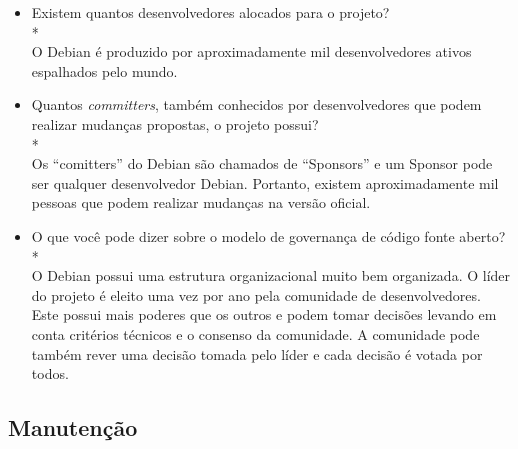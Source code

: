 \documentclass[12pt,a4paper]{article} %
\begin{document}
\begin{itemize}
\item Existem quantos desenvolvedores alocados para o projeto?
\\*
\\O Debian é produzido por aproximadamente mil desenvolvedores ativos espalhados pelo mundo.
\linebreak
\item Quantos \textit{committers}, também conhecidos por desenvolvedores que podem realizar mudanças propostas, o projeto possui?
\\*
\\Os “comitters” do Debian são chamados de “Sponsors” e um Sponsor pode ser qualquer desenvolvedor Debian. Portanto, existem aproximadamente mil pessoas que podem realizar mudanças na versão oficial.
\linebreak
\item O que você pode dizer sobre o modelo de governança de código fonte aberto?
\\*
\\O Debian possui uma estrutura organizacional muito bem organizada. O líder do projeto é eleito uma vez por ano pela comunidade de desenvolvedores. Este possui mais poderes que os outros e podem tomar decisões levando em conta critérios técnicos e o consenso da comunidade. A comunidade pode também rever uma decisão tomada pelo líder e cada decisão é votada por todos.
\linebreak
\end{itemize}

\subsection{Manutenção}
\end{document}
